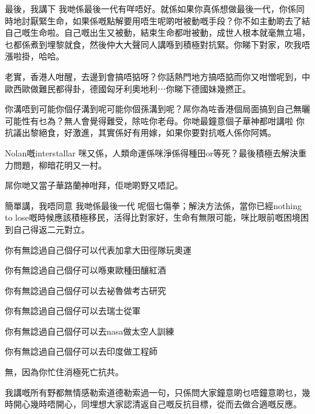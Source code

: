 最後，我講下 我哋係最後一代有咩唔好。就係如果你真係想做最後一代，你係同時地討厭緊生命，如果係嘅點解要用唔生呢啲咁被動嘅手段？你不如主動啲去了結自己嘅生命啦。自己嘅出生又被動，結束生命都咁被動，成世人根本就毫無立場，乜都係煮到埋黎就食，然後仲大大聲同人講喺到積極對抗緊。你睇下對家，吹我唔漲啦掛，哈哈。

老實，香港人咁醒，去邊到會搞唔掂呀？你話熱門地方搞唔掂而你又咁憎呢到，中歐西歐做難民都得卦，德國匈牙利奧地利⋯你睇下德國妹幾撚正。

你溝唔到可能你個仔溝到呢可能你個孫溝到呢？屌你為咗香港個局面搞到自己無曬可能性有乜為？無人會覺得難受，除咗你老母。你哋最鐘意個子華神都咁講啦 你抗議出黎絕食，好激進，其實係好有用嫁，如果你要對抗嘅人係你阿媽。

Nolan嘅interstallar 咪又係，人類命運係咪淨係得種田or等死？最後積極去解決重力問題，柳暗花明又一村。

屌你哋又當子華路蘭神咁拜，佢哋啲野又唔記。

簡單講，我唔同意 我哋係最後一代 呢個七傷拳；解決方法係，當你已經nothing to lose嘅時候應該積極移民，活得比對家好，生命有無限可能，咪比眼前嘅困境困到自己得返二元對立。

你有無諗過自己個仔可以代表加拿大田徑隊玩奧運

你有無諗過自己個仔可以喺東歐種田釀紅酒

你有無諗過自己個仔可以去袐魯做考古研究

你有無諗過自己個仔可以去瑞士從軍

你有無諗過自己個仔可以去nasa做太空人訓練

你有無諗過自己個仔可以去印度做工程師

無，因為你忙住消極死亡抗共。

我講嘅所有野都無情感勒索道德勒索過一句，只係問大家鐘意啲乜唔鐘意啲乜，幾時開心幾時唔開心，同埋想大家認清返自己嘅反抗目標，從而去做合適嘅反應。

